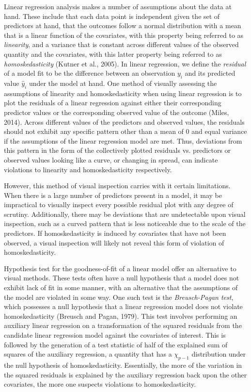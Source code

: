 		Linear regression analysis makes a number of assumptions about the data at hand. These include that each data point is independent given the set of predictors at hand, that the
		outcomes follow a normal distribution with a mean that is a linear function of the covariates, with this property being referred to as \textit{linearity}, and a variance that is constant
		across different values of the observed quantity and the covariates, with this latter property being referred to as \textit{homoskedasticity} (Kutner et al., 2005). In linear regression,
		we define the \textit{residual} of a model fit to be the difference between an observation $y_i$ and its predicted value $\hat{y}_i$ under the model at hand. One method of visually
		assessing the assumptions of linearity and homoskedasticity when using linear regression is to plot the residuals of a linear regression against either their corresponding predictor
		values or the corresponding observed value of the outcome (Miles, 2014). Across different values of the predictors and observed values, the residuals should not exhibit any specific pattern
		other than a mean of 0 and equal variance if the assumptions of the linear regression model are met. Thus, deviations from this pattern in the form of the collectively plotted residuals
		vs. predictors or observed values looking like a curve, or changing in spread, can indicate violations to linearity and homoskedasticity respectively.

		However, this method of visual inspection carries with it certain limitations. When there is a large number of predictors present in a model, it may be impractical to visually inspect every
		possible residual plot with any degree of scrutiny. Additionally, there may be deviations that are undetectable upon visual inspection, such as a curved pattern that is less noticeable
		due to the scale of the predictors. If homoskedasticity is induced by covariates that have not been observed, a visual inspection will likely not reveal this form of
		violation of homoskedasticity.

		Hypothesis test for the goodness-of-fit of a linear model offer an alternative to visual methods. These tests often have a null hypothesis that a model does not exhibit lack of fit in 
		some manner, with an alternative that the assumptions of the model are violated in some way. One such test is the \textit{Breusch-Pagan test}, which possesses a null hypothesis that a linear
		regression model does not violate homoskedasticity (Breusch and Pagan, 1979). This test involves performing an auxiliary linear regression on a transformation of the squared residuals from
		the candidate linear regression model against the covariates of interest. This is followed by the generation of a test statistic of half of the explained sum of squares of the auxiliary
		regression, a quantity that has a $\chi_{p-1}$ distribution under the null hypothesis of homoskedasticity. Essentially, the more of the variation in the squared residuals is explained by the
		auxiliary regression back upon the other covariates, the more one suspects violations to homoskedasticity.

